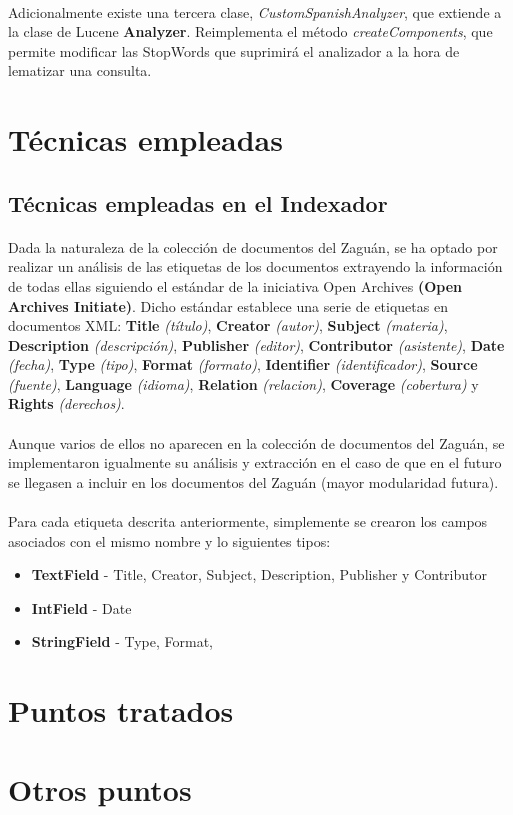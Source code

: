 \documentclass[a4paper]{article}
\begin{document}
\paragraph{}Adicionalmente existe una tercera clase, \textit{CustomSpanishAnalyzer}, que extiende a la clase de Lucene \textbf{Analyzer}. Reimplementa el método \textit{createComponents}, que permite modificar las StopWords que suprimirá el analizador a la hora de lematizar una consulta.

\section{Técnicas empleadas}
\subsection{Técnicas empleadas en el Indexador}
\paragraph{}Dada la naturaleza de la colección de documentos del Zaguán, se ha optado por realizar un análisis de las etiquetas de los documentos extrayendo la información de todas ellas siguiendo el estándar de la iniciativa Open Archives \textbf{(Open Archives Initiate)}. Dicho estándar establece una serie de etiquetas en documentos XML: \textbf{Title} \textit{(título)}, \textbf{Creator} \textit{(autor)}, \textbf{Subject} \textit{(materia)}, \textbf{Description} \textit{(descripción)}, \textbf{Publisher} \textit{(editor)}, \textbf{Contributor} \textit{(asistente)}, \textbf{Date} \textit{(fecha)},
\textbf{Type} \textit{(tipo)}, \textbf{Format} \textit{(formato)}, \textbf{Identifier} \textit{(identificador)}, \textbf{Source} \textit{(fuente)}, \textbf{Language} \textit{(idioma)}, \textbf{Relation} \textit{(relacion)}, \textbf{Coverage} \textit{(cobertura)} y \textbf{Rights} \textit{(derechos)}.
\paragraph{}Aunque varios de ellos no aparecen en la colección de documentos del Zaguán, se implementaron igualmente su análisis y extracción en el caso de que en el futuro se llegasen a incluir en los documentos del Zaguán (mayor modularidad futura).
\paragraph{}Para cada etiqueta descrita anteriormente, simplemente se crearon los campos asociados con el mismo nombre y lo siguientes tipos:
\begin{itemize}
	\item \textbf{TextField} - Title, Creator, Subject, Description, Publisher y Contributor
	\item \textbf{IntField} - Date
	\item \textbf{StringField} - Type, Format,
\end{itemize}


\section{Puntos tratados}

\section{Otros puntos}
\end{document}
